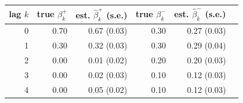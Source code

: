 \begin{tabular}{rrrrrr}
\toprule
lag $k$ & true $\beta^{+}_k$ & est. $\hat\beta^{+}_k$ (s.e.) & true $\beta^{-}_k$ & est. $\hat\beta^{-}_k$ (s.e.) & \\
\midrule
0 & 0.70 & 0.67 (0.03) & 0.30 & 0.27 (0.03) & \\
1 & 0.30 & 0.32 (0.03) & 0.30 & 0.29 (0.04) & \\
2 & 0.00 & 0.01 (0.02) & 0.20 & 0.20 (0.03) & \\
3 & 0.00 & 0.02 (0.03) & 0.10 & 0.12 (0.03) & \\
4 & 0.00 & 0.05 (0.02) & 0.10 & 0.12 (0.03) & \\
\bottomrule
\end{tabular}